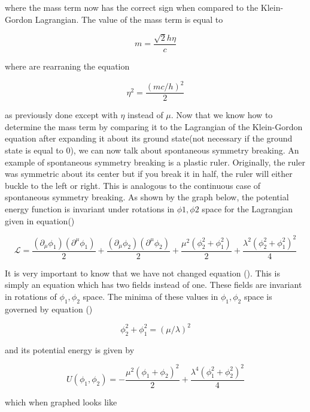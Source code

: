 \documentclass[12pt]{article}
\begin{document}
where the mass term now has the correct sign when compared to the Klein-Gordon Lagrangian. The value of the mass term is equal to 

\begin{equation}
m=\frac{\surd{2}h\eta}{c}
\end{equation}

where are rearraning the equation 

\begin{equation}
\eta^2 = \frac{(mc/h)^2}{2}
\end{equation}

as previously done except with $\eta$ instead of $\mu$. Now that we know how to determine the mass term by comparing it to the Lagrangian of the Klein-Gordon equation after expanding it about its ground state(not necessary if the ground state is equal to 0), we can now talk about spontaneous symmetry breaking. An example of spontaneous symmetry breaking is a plastic ruler. Originally, the ruler was symmetric about its center but if you break it in half, the ruler will either buckle to the left or right. This is analogous to the continuous case of spontaneous symmetry breaking. As shown by the graph below, the potential energy function is invariant under rotations in $\phi1,\phi2$ space for the Lagrangian given in equation() 

\begin{equation}
	\mathcal{L}=\frac{(\partial_\mu\phi_1)(\partial^\mu\phi_1)}{2}+\frac{(\partial_\mu\phi_2)(\partial^\mu\phi_2)}{2}+\frac{\mu^2(\phi_2^2+\phi_1^2)}{2}+\frac{\lambda^2(\phi_2^2+\phi_1^2)^2}{4}
\end{equation}

It is very important to know that we have not changed equation (). This is simply an equation which has two fields instead of one. These fields are invariant in rotations of $\phi_1,\phi_2$ space. The minima of these values in $\phi_1,\phi_2$ space is governed by equation ()

\begin{equation}
\phi_2^2+\phi_1^2=(\mu/\lambda)^2
\end{equation}

and its potential energy is given by

\begin{equation}
U(\phi_1,\phi_2)=-\frac{\mu^2(\phi_1+\phi_2)^2}{2}+\frac{\lambda^4(\phi_1^2+\phi_2^2)^2}{4}
\end{equation}

which when graphed looks like
\end{document}
